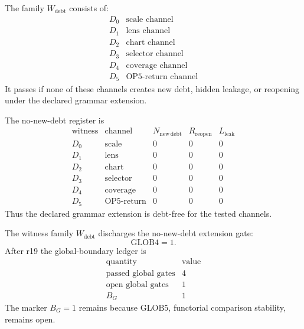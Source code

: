 \begin{definition}
The family \(W_{\mathrm{debt}}\) consists of:
\[
\begin{array}{c|l}
D_0 & \text{scale channel}\\
D_1 & \text{lens channel}\\
D_2 & \text{chart channel}\\
D_3 & \text{selector channel}\\
D_4 & \text{coverage channel}\\
D_5 & \text{OP5-return channel}
\end{array}
\]
It passes if none of these channels creates new debt, hidden leakage, or
reopening under the declared grammar extension.
\end{definition}

\begin{proposition}
The no-new-debt register is
\[
\begin{array}{c|c|r|r|r}
\text{witness} & \text{channel} & N_{\mathrm{new\,debt}} & R_{\mathrm{reopen}} & L_{\mathrm{leak}}\\
\hline
D_0 & \text{scale} & 0 & 0 & 0\\
D_1 & \text{lens} & 0 & 0 & 0\\
D_2 & \text{chart} & 0 & 0 & 0\\
D_3 & \text{selector} & 0 & 0 & 0\\
D_4 & \text{coverage} & 0 & 0 & 0\\
D_5 & \text{OP5-return} & 0 & 0 & 0
\end{array}
\]
Thus the declared grammar extension is debt-free for the tested channels.
\end{proposition}

\begin{theorem}
The witness family \(W_{\mathrm{debt}}\) discharges the no-new-debt extension
gate:
\[
    \mathrm{GLOB4}=1.
\]
After r19 the global-boundary ledger is
\[
\begin{array}{c|r}
\text{quantity} & \text{value}\\
\hline
\text{passed global gates} & 4\\
\text{open global gates} & 1\\
B_G & 1
\end{array}
\]
The marker \(B_G=1\) remains because \(\mathrm{GLOB5}\), functorial comparison
stability, remains open.
\end{theorem}

